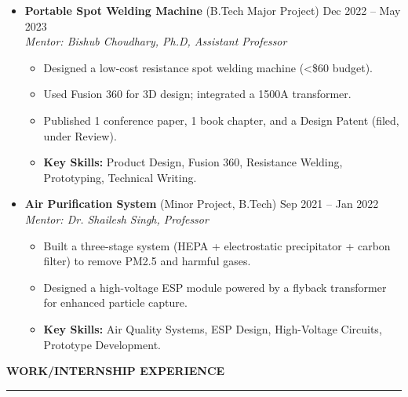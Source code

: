 \documentclass[letterpaper,10pt]{article}
\newcommand{\sectionline}[1]{%
    \vspace{0.7em}%
    \textbf{\large #1} \vspace{-2.0em}\\%
    
    \rule{\textwidth}{0.5pt}%
    \vspace{0.25em}%
}
\begin{document}
\begin{itemize}[leftmargin=*]
\item \textbf{Portable Spot Welding Machine} (B.Tech Major Project) \hfill Dec 2022 -- May 2023\\
  \textit{Mentor: Bishub Choudhary, Ph.D, Assistant Professor}
  \begin{itemize}[noitemsep,topsep=0pt]
    \item Designed a low-cost resistance spot welding machine (\textless\$60 budget).
    \item Used Fusion 360 for 3D design; integrated a 1500A transformer.
    \item Published 1 conference paper, 1 book chapter, and a Design Patent (filed, under Review).
    \item \textbf{Key Skills:} Product Design, Fusion 360, Resistance Welding, Prototyping, Technical Writing.
  \end{itemize}
      \vspace{0.5em}

\item \textbf{Air Purification System} (Minor Project, B.Tech) \hfill Sep 2021 -- Jan 2022\\
  \textit{Mentor: Dr. Shailesh Singh, Professor}
  \begin{itemize}[noitemsep,topsep=0pt]
    \item Built a three-stage system (HEPA + electrostatic precipitator + carbon filter) to remove PM2.5 and harmful gases.
    \item Designed a high-voltage ESP module powered by a flyback transformer for enhanced particle capture.
    \item \textbf{Key Skills:} Air Quality Systems, ESP Design, High-Voltage Circuits, Prototype Development.
  \end{itemize}
      \vspace{0.5em}

\end{itemize}
\sectionline{WORK/INTERNSHIP EXPERIENCE}
\end{document}
